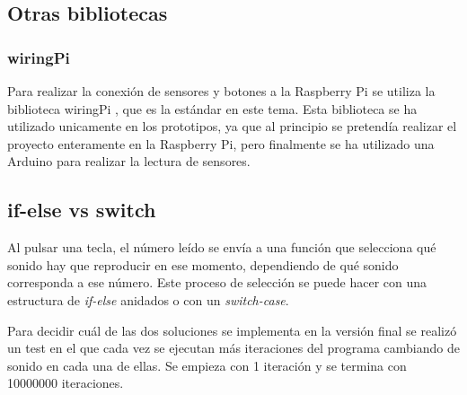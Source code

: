 

        \subsection{Otras bibliotecas} %
        \label{sub:OtrasLibrerias}

            \subsubsection{wiringPi} %
            \label{ssub:WiringPi}

                Para realizar la conexión de sensores y botones a la Raspberry Pi se utiliza la biblioteca
                wiringPi \cite{wiringPi}, que es la estándar en este tema. Esta biblioteca se ha utilizado unicamente en
                los prototipos, ya que al principio se pretendía realizar el proyecto enteramente en la Raspberry Pi,
                pero finalmente se ha utilizado una Arduino para realizar la lectura de sensores.



        \subsection{if-else vs switch} %
        \label{sub:if-else_vs_switch}

            Al pulsar una tecla, el número leído se envía a una función que selecciona qué sonido hay que reproducir en
            ese momento, dependiendo de qué sonido corresponda a ese número. Este proceso de selección se puede hacer
            con una estructura de \textit{if-else} anidados o con un \textit{switch-case}.

            Para decidir cuál de las dos soluciones se implementa en la versión final se realizó un test en el que cada
            vez se ejecutan más iteraciones del programa cambiando de sonido en cada una de ellas. Se empieza con 1
            iteración y se termina con 10000000 iteraciones.

